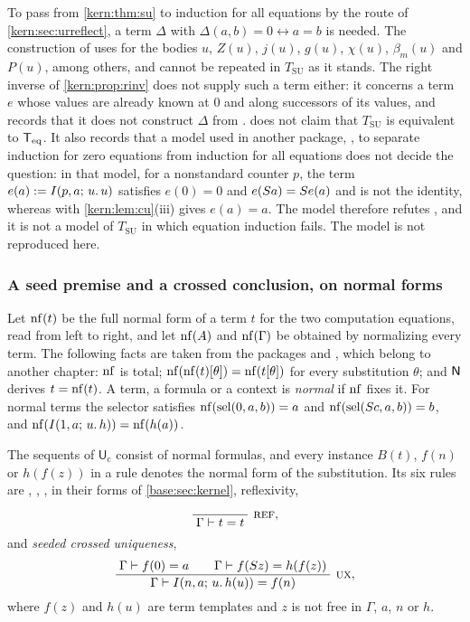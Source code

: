 \begin{remark}
\label{kern:rem:sugap}
To pass from \cref{kern:thm:su} to induction for all equations by the route
of \cref{kern:sec:urreflect}, a term $\Delta$ with
$\Delta(a,b)=0\leftrightarrow a=b$ is needed.  The construction of
 uses  for the
bodies $u$, $Z(u)$, $j(u)$, $g(u)$, $\chi(u)$, $\beta_m(u)$ and $P(u)$,
among others, and cannot be repeated in $T_{\mathrm{SU}}$ as it stands.
The right inverse of \cref{kern:prop:rinv} does not supply such a term
either: it concerns a term $e$ whose values are already known at $0$ and
along successors of its values, and  records that it does
not construct $\Delta$ from .   does not claim that $T_{\mathrm{SU}}$ is equivalent to
$\mathsf{T}_{\mathrm{eq}}$.  It also records that a model used in another package,
, to separate induction for zero equations from
induction for all equations does not decide the question: in that model,
for a nonstandard counter $p$, the term $e(a)\mathrel{:=}I(p,a;\,u.\,u)$
satisfies $e(0)=0$ and $e(S a)=S e(a)$ and is not the identity,
whereas  with \cref{kern:lem:cu}(iii) gives $e(a)=a$.  The
model therefore refutes , and it is not a model of
$T_{\mathrm{SU}}$ in which equation induction fails.  The model is not
reproduced here.
\end{remark}

\subsubsection*{A seed premise and a crossed conclusion, on normal forms}

Let $\operatorname{nf}(t)$ be the full normal form of a term $t$ for the two computation
equations, read from left to right, and let $\operatorname{nf}(A)$ and $\operatorname{nf}(\Gamma)$ be
obtained by normalizing every term.  The following facts are taken from the
packages  and , which
belong to another chapter: $\operatorname{nf}$ is total; $\operatorname{nf}(\operatorname{nf}(t)[\theta])=\operatorname{nf}(t[\theta])$
for every substitution $\theta$; and $\mathsf{N}$ derives $t=\operatorname{nf}(t)$.  A term, a
formula or a context is \emph{normal} if $\operatorname{nf}$ fixes it.  For normal terms
the selector satisfies $\operatorname{nf}(\operatorname{sel}(0,a,b))=a$ and $\operatorname{nf}(\operatorname{sel}(S c,a,b))=b$,
and $\operatorname{nf}(I(1,a;\,u.\,h))=\operatorname{nf}(h(a))$.

\begin{definition}
\label{kern:def:Uc}
The sequents of $\mathsf{U}_{\mathrm{c}}$ consist of normal formulas, and
every instance $B(t)$, $f(n)$ or $h(f(z))$ in a rule denotes the normal
form of the substitution.  Its six rules are , ,
,  in their forms of \cref{base:sec:kernel},
reflexivity,
\[
 \infrule{}{\Gamma\proves t=t}\ \rulename{Ref},
\]
and \emph{seeded crossed uniqueness},
\[
 \infrule{\Gamma\proves f(0)=a\qquad\Gamma\proves f(\Suc z)=h(f(z))}
         {\Gamma\proves\It{n}{a}{u}{h(u)}=f(n)}\ \rulename{UX},
\]
where $f(z)$ and $h(u)$ are term templates and $z$ is not free in $\Gamma$,
$a$, $n$ or $h$.
\end{definition}

